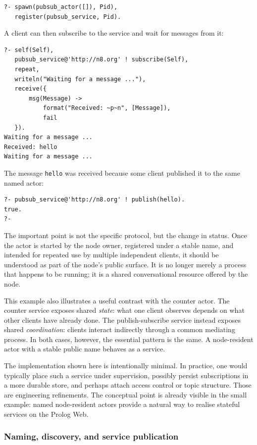 \begin{verbatim}
?- spawn(pubsub_actor([]), Pid),
   register(pubsub_service, Pid).
\end{verbatim}

\noindent A client can then subscribe to the service and wait for
messages from it:

\begin{verbatim}
?- self(Self),
   pubsub_service@'http://n8.org' ! subscribe(Self),
   repeat,
   writeln("Waiting for a message ..."),
   receive({
       msg(Message) ->
           format("Received: ~p~n", [Message]),
           fail
   }).
Waiting for a message ...
Received: hello
Waiting for a message ...
\end{verbatim}

\noindent The message \texttt{hello} was received because some client
published it to the same named actor:

\begin{verbatim}
?- pubsub_service@'http://n8.org' ! publish(hello).
true.
?-
\end{verbatim}

\noindent The important point is not the specific protocol, but the
change in status. Once the actor is started by the node owner,
registered under a stable name, and intended for repeated use by
multiple independent clients, it should be understood as part of the
node's public surface. It is no longer merely a process that happens
to be running; it is a shared conversational resource offered by the
node.

This example also illustrates a useful contrast with the
counter actor. The counter service exposes shared \emph{state}: what
one client observes depends on what other clients have already done.
The publish-subscribe service instead exposes shared
\emph{coordination}: clients interact indirectly through a common
mediating process. In both cases, however, the essential pattern is
the same. A node-resident actor with a stable public name behaves as
a service.

The implementation shown here is intentionally minimal. In
practice, one would typically place such a service under supervision,
possibly persist subscriptions in a more durable store, and perhaps
attach access control or topic structure. Those are engineering
refinements. The conceptual point is already visible in the small
example: named node-resident actors provide a natural way to realise
stateful services on the Prolog Web.

\subsubsection{Naming, discovery, and service publication}
\label{sec:naming-discovery}

